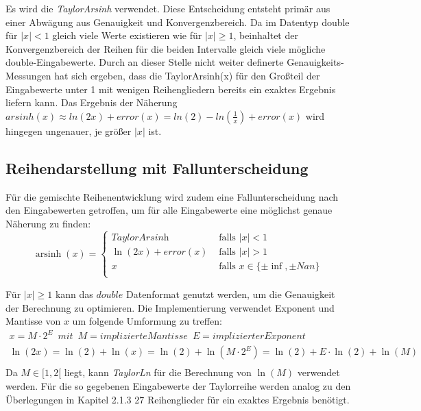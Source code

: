 \documentclass[course=erap] {aspdoc}
\begin{document}
    Es wird die \textit{TaylorArsinh} verwendet.
    Diese Entscheidung entsteht primär aus einer Abwägung aus Genauigkeit und Konvergenzbereich.
    Da im Datentyp double für $|x|<1$ gleich viele Werte existieren wie für $|x|\geq1$, beinhaltet der Konvergenzbereich der Reihen für die beiden Intervalle gleich viele mögliche double-Eingabewerte.
    Durch an dieser Stelle nicht weiter definerte Genauigkeits-Messungen hat sich ergeben, dass die TaylorArsinh(x) für den Großteil der Eingabewerte unter 1 mit wenigen Reihengliedern bereits ein exaktes Ergebnis liefern kann.
    Das Ergebnis der Näherung $ arsinh(x)\approx ln(2x) + error(x) = ln(2) - ln(\frac{1}{x}) + error(x)$ wird hingegen ungenauer, je größer $|x|$ ist. 

    \subsection{Reihendarstellung mit Fallunterscheidung}\label{subsec:reihendarstellung-mit-fallunterscheidung}

    Für die gemischte Reihenentwicklung wird zudem eine Fallunterscheidung nach den Eingabewerten getroffen, um für alle Eingabewerte eine möglichst genaue Näherung zu finden:
    \[ \operatorname{arsinh}(x) =
    \begin{cases}
        \textit{TaylorArsinh}     & \text{ falls } |x| < 1 \\
        \ln(2x) + error(x)  & \text{ falls } |x| >1 \\
        x     & \text{ falls } x \in \{\pm\inf, \pm Nan\}\\
    \end{cases}\]
    
    Für $|x|\geq1$ kann das $double$ Datenformat genutzt werden, um die Genauigkeit der Berechnung zu optimieren.
    Die Implementierung verwendet Exponent und Mantisse von $x$ um folgende Umformung zu treffen:
    \begin{gather*}
        x = M\cdot2^E \,\,\, mit \,\,\, M = implizierte Mantisse \,\,\, E = implizierter Exponent\\
        \ln(2x) = \ln(2) + \ln(x) = \ln(2) + \ln(M\cdot2^E) = \ln(2) + E\cdot\ln(2) + \ln(M)\\
    \end{gather*}
    Da $M\in[1, 2[$ liegt, kann \textit{TaylorLn} für die Berechnung von $\ln(M)$ verwendet werden.
    Für die so gegebenen Eingabewerte der Taylorreihe werden analog zu den Überlegungen in Kapitel 2.1.3 27 Reihenglieder für ein exaktes Ergebnis benötigt.
\end{document}
